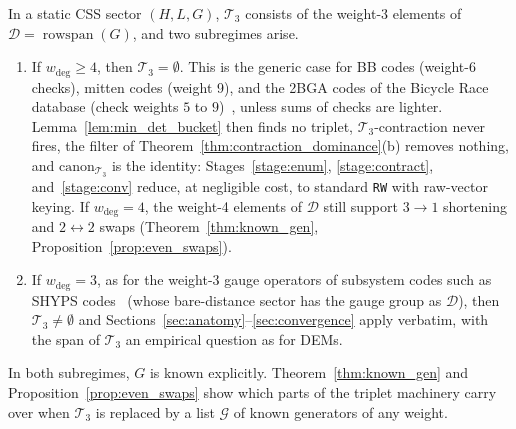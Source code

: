 \documentclass[12pt]{article}
\theoremstyle{definition}
\newcommand{\Dc}{\mathcal{D}}
\newcommand{\Tc}{\mathcal{T}_3}
\newcommand{\Gc}{\mathcal{G}}
\newcommand{\ttt}[1]{\texttt{#1}}
\begin{document}
In a static CSS sector $(H, L, G)$, $\Tc$ consists of the weight-3 elements of $\Dc = \operatorname{rowspan}(G)$, and
two subregimes arise.
\begin{enumerate}[label=(\alph*)]
  \item If $w_{\deg} \ge 4$, then $\Tc = \emptyset$. This is the generic case for BB codes (weight-6 checks), mitten
    codes (weight 9), and the 2BGA codes of the Bicycle Race database (check weights $5$ to
    $9$)~\cite{Lee2026BicycleRace}, unless sums of checks are lighter. Lemma~\ref{lem:min_det_bucket} then finds no
    triplet, $\Tc$-contraction never fires, the filter of Theorem~\ref{thm:contraction_dominance}(b) removes nothing,
    and $\mathrm{canon}_{\Tc}$ is the identity: Stages~\ref{stage:enum}, \ref{stage:contract}, and~\ref{stage:conv}
    reduce, at negligible cost, to standard \ttt{RW} with raw-vector keying. If $w_{\deg} = 4$, the weight-4 elements
    of $\Dc$ still support $3 \to 1$ shortening and $2 \leftrightarrow 2$ swaps (Theorem~\ref{thm:known_gen},
    Proposition~\ref{prop:even_swaps}).
  \item If $w_{\deg} = 3$, as for the weight-3 gauge operators of subsystem codes such as SHYPS
    codes~\cite{Malcolm2025SHYPS} (whose bare-distance sector has the gauge group as $\Dc$), then $\Tc \neq \emptyset$
    and Sections~\ref{sec:anatomy}--\ref{sec:convergence} apply verbatim, with the span of $\Tc$ an empirical question
    as for DEMs.
\end{enumerate}
In both subregimes, $G$ is known explicitly. Theorem~\ref{thm:known_gen} and Proposition~\ref{prop:even_swaps} show
which parts of the triplet machinery carry over when $\Tc$ is replaced by a list $\Gc$ of known generators of any
weight.
\end{document}
